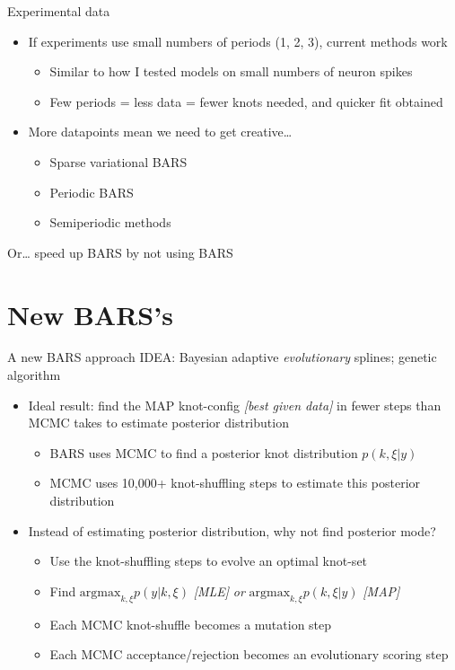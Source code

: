 \documentclass[presentation]{beamer}
\begin{document}
\begin{frame}[label={sec:orgc31c3ae}]{Experimental data}
\begin{itemize}
\item \alert{If experiments use small numbers of periods (1, 2, 3), current methods work}
\begin{itemize}
\item Similar to how I tested models on small numbers of neuron spikes
\item Few periods = less data = fewer knots needed, and quicker fit obtained
\end{itemize}
\item More datapoints mean we need to get creative\ldots{}
\begin{itemize}
\item Sparse variational BARS
\item Periodic BARS
\item Semiperiodic methods
\end{itemize}
\end{itemize}

\vfill
Or\ldots{} speed up BARS by not using BARS
\end{frame}

\section{New BARS's}
\label{sec:org65bfed9}
\begin{frame}[label={sec:orgedc71d2}]{A new BARS approach}
IDEA: Bayesian adaptive \emph{evolutionary} splines; genetic algorithm
\begin{itemize}[<+->]
\item Ideal result: find the MAP knot-config \emph{[best given data]} in fewer steps than MCMC takes to estimate posterior distribution
\begin{itemize}
\item BARS uses MCMC to find a posterior knot distribution \(p(k, \xi | y)\)
\item MCMC uses 10,000+ knot-shuffling steps to estimate this posterior distribution
\end{itemize}
\item Instead of estimating posterior distribution, why not find posterior mode?
\begin{itemize}
\item Use the knot-shuffling steps to evolve an optimal knot-set
\item Find \(\mathrm{argmax}_{k, \xi} p(y | k, \xi)\) \emph{[MLE]} \alert{\emph{or}} \(\mathrm{argmax}_{k, \xi} p( k, \xi | y)\) \emph{[MAP]}
\item Each MCMC knot-shuffle becomes a mutation step
\item Each MCMC acceptance/rejection becomes an evolutionary scoring step
\end{itemize}
\end{itemize}
\end{frame}
\end{document}
